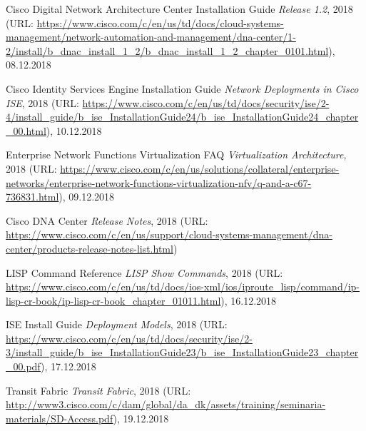 \begin{thebibliography}{}
	 Cisco Digital Network Architecture Center Installation Guide \textit{Release 1.2}, 2018 (URL: \url{https://www.cisco.com/c/en/us/td/docs/cloud-systems-management/network-automation-and-management/dna-center/1-2/install/b_dnac_install_1_2/b_dnac_install_1_2_chapter_0101.html}), 08.12.2018
	
	 Cisco Identity Services Engine Installation Guide \textit{Network Deployments in Cisco ISE}, 2018 (URL: \url{https://www.cisco.com/c/en/us/td/docs/security/ise/2-4/install_guide/b_ise_InstallationGuide24/b_ise_InstallationGuide24_chapter_00.html}), 10.12.2018

	 Enterprise Network Functions Virtualization FAQ \textit{Virtualization Architecture}, 2018 (URL: \url{https://www.cisco.com/c/en/us/solutions/collateral/enterprise-networks/enterprise-network-functions-virtualization-nfv/q-and-a-c67-736831.html}), 09.12.2018
	
	 Cisco DNA Center \textit{Release Notes}, 2018 (URL: \url{https://www.cisco.com/c/en/us/support/cloud-systems-management/dna-center/products-release-notes-list.html})
	
	 LISP Command Reference \textit{LISP Show Commands}, 2018 (URL: \url{https://www.cisco.com/c/en/us/td/docs/ios-xml/ios/iproute_lisp/command/ip-lisp-cr-book/ip-lisp-cr-book_chapter_01011.html}), 16.12.2018
	
	 ISE Install Guide \textit{Deployment Models}, 2018 (URL: \url{https://www.cisco.com/c/en/us/td/docs/security/ise/2-3/install_guide/b_ise_InstallationGuide23/b_ise_InstallationGuide23_chapter_00.pdf}), 17.12.2018	
	
	 Transit Fabric \textit{Transit Fabric}, 2018 (URL: \url{http://www3.cisco.com/c/dam/global/da_dk/assets/training/seminaria-materials/SD-Access.pdf}), 19.12.2018	
	
\end{thebibliography}
